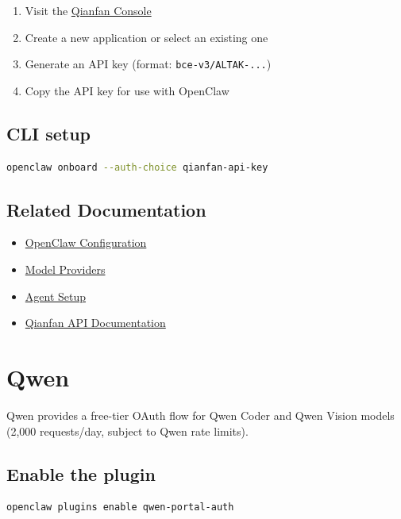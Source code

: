 \begin{enumerate}
  \item Visit the \href{https://console.bce.baidu.com/qianfan/ais/console/apiKey}{Qianfan Console}
  \item Create a new application or select an existing one
  \item Generate an API key (format: \texttt{bce-v3/ALTAK-...})
  \item Copy the API key for use with OpenClaw
\end{enumerate}


\subsection{CLI setup}


\begin{lstlisting}[language=bash]
openclaw onboard --auth-choice qianfan-api-key
\end{lstlisting}


\subsection{Related Documentation}


\begin{itemize}
  \item \href{/gateway/configuration}{OpenClaw Configuration}
  \item \href{/concepts/model-providers}{Model Providers}
  \item \href{/concepts/agent}{Agent Setup}
  \item \href{https://cloud.baidu.com/doc/qianfan-api/s/3m7of64lb}{Qianfan API Documentation}
\end{itemize}



\clearpage

\section{Qwen}


Qwen provides a free-tier OAuth flow for Qwen Coder and Qwen Vision models
(2,000 requests/day, subject to Qwen rate limits).

\subsection{Enable the plugin}


\begin{lstlisting}[language=bash]
openclaw plugins enable qwen-portal-auth
\end{lstlisting}


